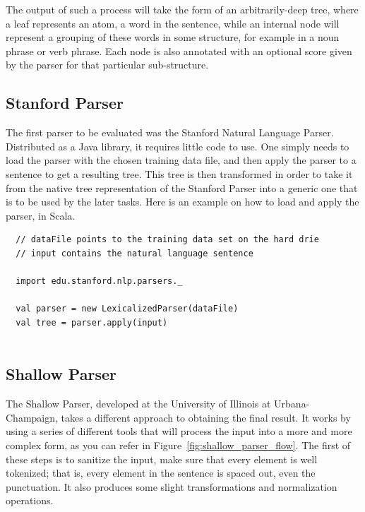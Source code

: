 The output of such a process will take the form of an arbitrarily-deep tree, where a leaf represents an atom, a word in the sentence, while an internal node will represent a grouping of these words in some structure, for example in a noun phrase or verb phrase. Each node is also annotated with an optional score given by the parser for that particular sub-structure.


\subsection{Stanford Parser} %
\label{sub:stanford_parser_impl}

The first parser to be evaluated was the Stanford Natural Language Parser. Distributed as a Java library, it requires little code to use. One simply needs to load the parser with the chosen training data file, and then apply the parser to a sentence to get a resulting tree. This tree is then transformed in order to take it from the native tree representation of the Stanford Parser into a generic one that is to be used by the later tasks. Here is an example on how to load and apply the parser, in Scala.

\begin{verbatim}
  // dataFile points to the training data set on the hard drie
  // input contains the natural language sentence
  
  import edu.stanford.nlp.parsers._
  
  val parser = new LexicalizedParser(dataFile)
  val tree = parser.apply(input)
  
\end{verbatim}



\subsection{Shallow Parser} %
\label{sub:shallow_parser}

The Shallow Parser, developed at the University of Illinois at Urbana-Champaign, takes a different approach to obtaining the final result. It works by using a series of different tools that will process the input into a more and more complex form, as you can refer in Figure~\ref{fig:shallow_parser_flow}. The first of these steps is to sanitize the input, make sure that every element is well tokenized; that is, every element in the sentence is spaced out, even the punctuation. It also produces some slight transformations and normalization operations.

